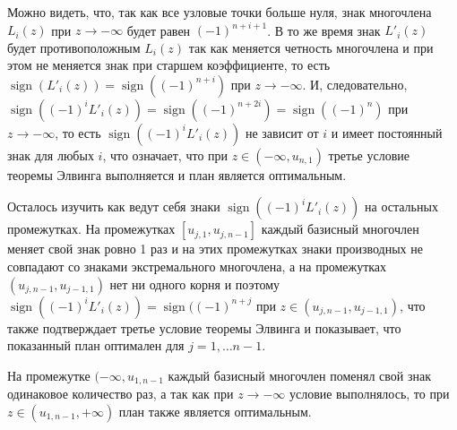 \documentclass[specialist,
               substylefile = spbu.rtx,
               subf,href,colorlinks=true, 12pt]{disser}
\theoremstyle{definition}
\DeclareMathOperator*{\sign}{sign}
\begin{document}
	Можно видеть, что, так как все узловые точки больше нуля, знак многочлена $L_i(z)$ при $z \to -\infty$ будет равен $(-1)^{n+i+1}$. В то же время знак $L'_i(z)$ будет противоположным $L_i(z)$ так как меняется четность многочлена и при этом не меняется знак при старшем коэффициенте, то есть $\sign(L'_i(z)) = \sign((-1)^{n+i})$ при $z \to -\infty$. И, следовательно, $\sign((-1)^i L'_i(z)) = \sign((-1)^{n+2i}) = \sign((-1)^{n})$ при $z \to -\infty$, то есть $\sign((-1)^i L'_i(z))$ не зависит от $i$ и имеет постоянный знак для любых $i$, что означает, что при $z \in (-\infty, u_{n, 1})$ третье условие теоремы Элвинга выполняется и план является оптимальным.
	
	Осталось изучить как ведут себя знаки $\sign((-1)^i L'_i(z))$ на остальных промежутках. На промежутках $[u_{j, 1}, u_{j, n-1}]$ каждый базисный многочлен меняет свой знак ровно 1 раз и на этих промежутках знаки производных не совпадают со знаками экстремального многочлена, а на промежутках $(u_{j, n-1}, u_{j-1, 1})$ нет ни одного корня и поэтому $\sign((-1)^i L'_i(z)) = \sign ((-1)^{n + j}$ при $z \in (u_{j, n-1}, u_{j-1, 1})$, что также подтверждает третье условие теоремы Элвинга и показывает, что показанный план оптимален для $j=1, \ldots n-1$.
	
	На промежутке $(-\infty, u_{1, n-1}$ каждый базисный многочлен поменял свой знак одинаковое количество раз, а так как при $z \to -\infty$ условие выполнялось, то при $z \in (u_{1, n-1}, +\infty)$ план также является оптимальным.
	
	
	
	 
	
	
	
	
	
	

	
	
\end{document}
